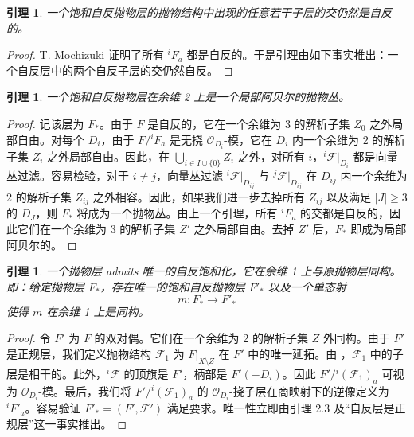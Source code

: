 \documentclass[12pt,a4paper]{article}
\newtheorem{lemma}[theorem]{引理}
\begin{document}
\begin{lemma}
一个饱和自反抛物层的抛物结构中出现的任意若干子层的交仍然是自反的。
\end{lemma}

\begin{proof}
T. Mochizuki \cite[Proposition 3.1.2]{MochizukiBook} 证明了所有 \({}^iF_a\) 都是自反的。于是引理由如下事实推出：一个自反层中的两个自反子层的交仍然自反。
\end{proof}

\begin{lemma}
一个饱和自反抛物层在余维 2 上是一个局部阿贝尔的抛物丛。
\end{lemma}

\begin{proof}
记该层为 \(F_*\)。由于 \(F\) 是自反的，它在一个余维为 3 的解析子集 \(Z_0\) 之外局部自由。对每个 \(D_i\)，由于 \(F/{}^iF_a\) 是无挠 \(\mathcal O_{D_i}\)-模，它在 \(D_i\) 内一个余维为 2 的解析子集 \(Z_i\) 之外局部自由。因此，在 \(\bigcup_{i\in I\cup\{0\}} Z_i\) 之外，对所有 \(i\)，\({}^i\mathcal F|_{D_i}\) 都是向量丛过滤。容易检验，对于 \(i\neq j\)，向量丛过滤 \({}^i\mathcal F|_{D_{ij}}\) 与 \({}^j\mathcal F|_{D_{ij}}\) 在 \(D_{ij}\) 内一个余维为 2 的解析子集 \(Z_{ij}\) 之外相容。因此，如果我们进一步去掉所有 \(Z_{ij}\) 以及满足 \(|J|\ge 3\) 的 \(D_J\)，则 \(F_*\) 将成为一个抛物丛。由上一个引理，所有 \({}^iF_a\) 的交都是自反的，因此它们在一个余维为 3 的解析子集 \(Z'\) 之外局部自由。去掉 \(Z'\) 后，\(F_*\) 即成为局部阿贝尔的。
\end{proof}

\begin{lemma}
一个抛物层 admits 唯一的自反饱和化，它在余维 1 上与原抛物层同构。即：给定抛物层 \(F_*\)，存在唯一的饱和自反抛物层 \(F'_{*}\) 以及一个单态射
\[
m:F_*\to F'_*
\]
使得 \(m\) 在余维 1 上是同构。
\end{lemma}

\begin{proof}
令 \(F'\) 为 \(F\) 的双对偶。它们在一个余维为 2 的解析子集 \(Z\) 外同构。由于 \(F'\) 是正规层，我们定义抛物结构 \(\mathcal F_1\) 为 \(F|_{X\setminus Z}\) 在 \(F'\) 中的唯一延拓。由 \cite[Theorem 2.2]{SiuTrautmann}，\(\mathcal F_1\) 中的子层是相干的。此外，\({}^i\mathcal F\) 的顶旗是 \(F'\)，柄部是 \(F'(-D_i)\)。因此 \(F'/{}^i(\mathcal F_1)_a\) 可视为 \(\mathcal O_{D_i}\)-模。最后，我们将 \(F'/{}^i(\mathcal F_1)_a\) 的 \(\mathcal O_{D_i}\)-挠子层在商映射下的逆像定义为 \({}^iF'_a\)。容易验证 \(F'_*=(F',\mathcal F')\) 满足要求。唯一性立即由引理 2.3 及“自反层是正规层”这一事实推出。
\end{proof}
\end{document}
